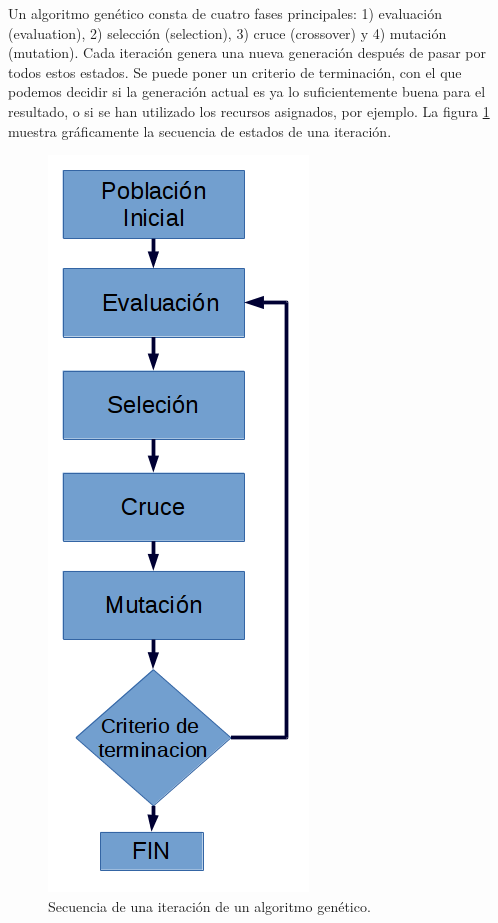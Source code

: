 \documentclass[10pt,a4paper]{article}
\begin{document}
Un algoritmo genético consta de cuatro fases principales: 1) evaluación (evaluation), 2) selección (selection), 3) cruce (crossover) y 4) mutación (mutation). Cada iteración genera una nueva generación después de pasar por todos estos estados. Se puede poner un criterio de terminación, con el que podemos decidir si la generación actual es ya lo suficientemente buena para el resultado, o si se han utilizado los recursos asignados, por ejemplo. La figura \ref{fig:gaIteration} muestra gráficamente la secuencia de estados de una iteración.

\begin{figure}[h]
\centering
\includegraphics[scale=0.4]{GaIteration.png} 
\caption{Secuencia de una iteración de un algoritmo genético.}
\label{fig:gaIteration}
\end{figure}
\end{document}
